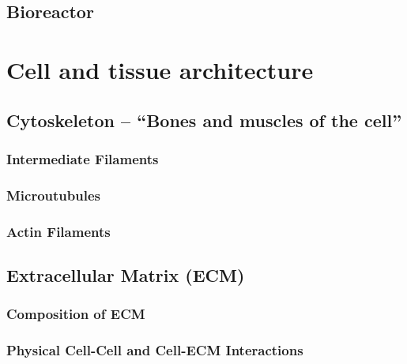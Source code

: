 \documentclass[12pt]{cheatsheet}
\begin{document}
\subsection*{Bioreactor}


\section*{Cell and tissue architecture}
\subsection*{Cytoskeleton – “Bones and muscles of the cell”}

\subsubsection*{Intermediate Filaments}

\subsubsection*{Microutubules}

\subsubsection*{Actin Filaments}

\subsection*{Extracellular Matrix (ECM)}

\subsubsection*{Composition of ECM}

\subsubsection*{Physical Cell-Cell and Cell-ECM Interactions}





\end{document}
